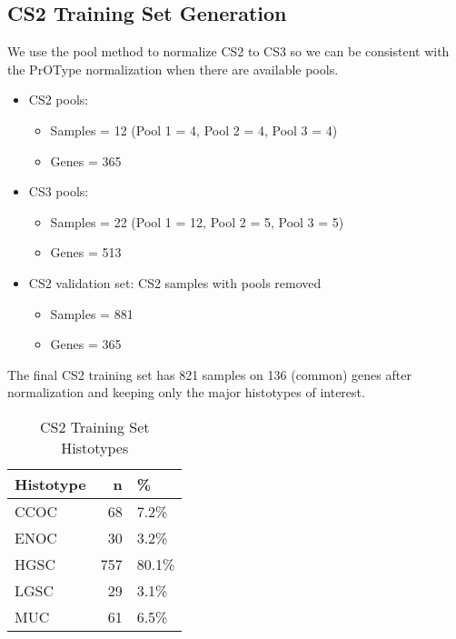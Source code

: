 \documentclass[
]{report}
\providecommand{\tightlist}{%
  \setlength{\itemsep}{0pt}\setlength{\parskip}{0pt}}
\begin{document}
\hypertarget{cs2-training-set-generation}{%
\subsection{CS2 Training Set Generation}\label{cs2-training-set-generation}}

We use the pool method to normalize CS2 to CS3 so we can be consistent with the PrOType normalization when there are available pools.

\begin{itemize}
\item
  CS2 pools:

  \begin{itemize}
  \tightlist
  \item
    Samples = 12 (Pool 1 = 4, Pool 2 = 4, Pool 3 = 4)
  \item
    Genes = 365
  \end{itemize}
\item
  CS3 pools:

  \begin{itemize}
  \tightlist
  \item
    Samples = 22 (Pool 1 = 12, Pool 2 = 5, Pool 3 = 5)
  \item
    Genes = 513
  \end{itemize}
\item
  CS2 validation set: CS2 samples with pools removed

  \begin{itemize}
  \tightlist
  \item
    Samples = 881
  \item
    Genes = 365
  \end{itemize}
\end{itemize}

The final CS2 training set has 821 samples on 136 (common) genes after normalization and keeping only the major histotypes of interest.

\begin{table}

\caption{\label{tab:training-dist-cs2}CS2 Training Set Histotypes}
\centering
\begin{tabular}[t]{l|r|l}
\hline
Histotype & n & \%\\
\hline
CCOC & 68 & 7.2\%\\
\hline
ENOC & 30 & 3.2\%\\
\hline
HGSC & 757 & 80.1\%\\
\hline
LGSC & 29 & 3.1\%\\
\hline
MUC & 61 & 6.5\%\\
\hline
\end{tabular}
\end{table}
\end{document}
